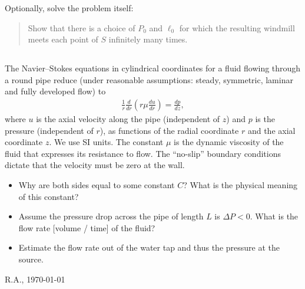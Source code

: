 \documentclass[12pt,a4paper]{article}
\begin{document}
    Optionally, solve the problem itself:
    \begin{quote}
        Show that there is a choice of $P_0$ and $\ell_0$
        for which
        the resulting windmill 
        meets each point of $S$ infinitely many times.
    \end{quote}
    
    
    
    \subsection{}
    
    The Navier--Stokes equations 
    in cylindrical coordinates
    for a fluid flowing
    through a round pipe
    reduce 
    (under reasonable assumptions: steady, symmetric, laminar and fully developed flow)
    to 
    \begin{align}
        \frac{1}{r}
        \frac{d}{dr} \left( r \mu \frac{d u}{dr} \right)
        =
        \frac{d p}{d z}
        ,
    \end{align}
    where $u$ is the axial velocity along the pipe
    (independent of $z$)
    and $p$ is the pressure
    (independent of $r$),
    as functions of the radial coordinate $r$ and the axial coordinate $z$.
    We use SI units.
    The constant $\mu$ is the dynamic viscosity of the fluid
    that expresses its resistance to flow.
    The ``no-slip'' boundary conditions 
    dictate that 
    the velocity must be zero at the wall.
    
    \begin{itemize}
    \item  
        Why are both sides equal to some constant $C$?
        What is the physical meaning of this constant?
    \item
        Assume the pressure drop across the pipe 
        of length $L$ is $\Delta P < 0$.
        What is the flow rate [volume / time]
        of the fluid?
    \item
        Estimate the flow rate out of the water tap
        and 
        thus the pressure at the source.
    \end{itemize}


    
    
    
    


    \vfill\hfill R.A., \today
\end{document}
